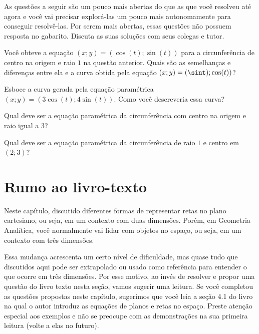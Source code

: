 \documentclass[main_estudante.tex]{subfiles}
\begin{document}
As questões a seguir são um pouco mais abertas do que as que você resolveu até agora e você vai precisar explorá-las um pouco mais autonomamente para conseguir resolvê-las. Por serem mais abertas, essas questões não possuem resposta no gabarito. Discuta as suas soluções com seus colegas e tutor.

\begin{questao}
Você obteve a equação $(x;y)=(\cos(t);\sin(t))$ para a circunferência de centro na origem e raio $1$ na questão anterior. Quais são as semelhanças e diferenças entre ela e a curva obtida pela equação $(x;y)=(\sint);\cos(t))$?
\end{questao}

\begin{questao}
Esboce a curva gerada pela equação paramétrica $(x;y)=(3\cos(t);4\sin(t))$. Como você descreveria essa curva?
\end{questao}

\begin{questao}
Qual deve ser a equação paramétrica da circunferência com centro na origem e raio igual a $3$?
\end{questao}

\begin{questao}
Qual deve ser a equação paramétrica da circunferência de raio $1$ e centro em $(2;3)$?
\end{questao}

\newpage

\section{Rumo ao livro-texto}

Neste capítulo, discutido diferentes formas de representar retas no plano cartesiano, ou seja, em um contexto com duas dimensões. Porém, em Geometria Analítica, você normalmente vai lidar com objetos no espaço, ou seja, em um contexto com três dimensões.

Essa mudança acrescenta um certo nível de dificuldade, mas quase tudo que discutidos aqui pode ser extrapolado ou usado como referência para entender o que ocorre em três dimensões. Por esse motivo, ao invés de resolver e propor uma questão do livro texto nesta seção, vamos sugerir uma leitura. Se você completou as questões propostas neste capítulo, sugerimos que você leia a seção 4.1 do livro  na qual o autor introduz as equações de planos e retas no espaço. Preste atenção especial aos exemplos e não se preocupe com as demonstrações na sua primeira leitura (volte a elas no futuro).
\end{document}
